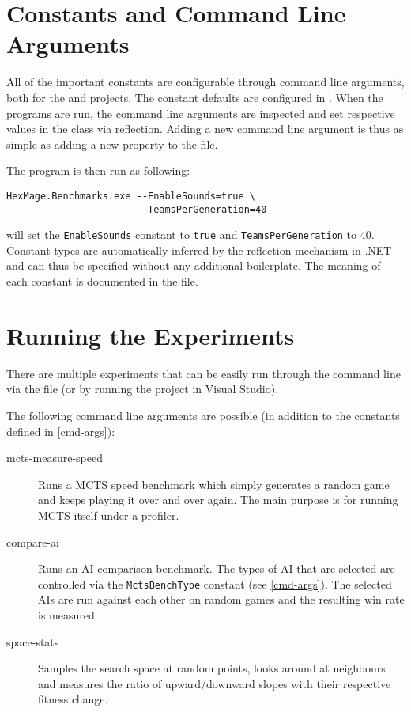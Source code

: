 \section{Constants and Command Line Arguments}
\label{cmd-args}

All of the important constants are configurable through command line arguments, both for the  and  projects. The constant defaults are configured in . When the programs are run, the command line arguments are inspected and set respective values in the  class via reflection. Adding a new command line argument is thus as simple as adding a new property to the  file.

The program is then run as following:

\begin{verbatim}
HexMage.Benchmarks.exe --EnableSounds=true \
                       --TeamsPerGeneration=40
\end{verbatim}

will set the \verb|EnableSounds| constant to \verb|true| and \verb|TeamsPerGeneration| to $40$. Constant types are automatically inferred by the reflection mechanism in .NET and can thus be specified without any additional boilerplate. The meaning of each constant is documented in the  file. 

\section{Running the Experiments}

There are multiple experiments that can be easily run through the command line via the  file (or by running the  project in Visual Studio).

The following command line arguments are possible (in addition to the constants defined in \autoref{cmd-args}):

\begin{description}
	\item[mcts-measure-speed] Runs a MCTS speed benchmark which simply generates a random game and keeps playing it over and over again. The main purpose is for running MCTS itself under a profiler.
	
	\item[compare-ai] Runs an AI comparison benchmark. The types of AI that are selected are controlled via the \verb|MctsBenchType| constant (see \autoref{cmd-args}). The selected AIs are run against each other on random games and the resulting win rate is measured.
	
	\item[space-stats] Samples the search space at random points, looks around at neighbours and measures the ratio of upward/downward slopes with their respective fitness change.
\end{description}

